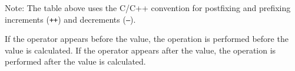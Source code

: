 Note: The table above uses the C/C++ convention for postfixing and prefixing increments (\texttt{++}) and decrements (\texttt{--}).
\par If the operator appears before the value, the operation is performed before the value is calculated.
If the operator appears after the value, the operation is performed after the value is calculated.
